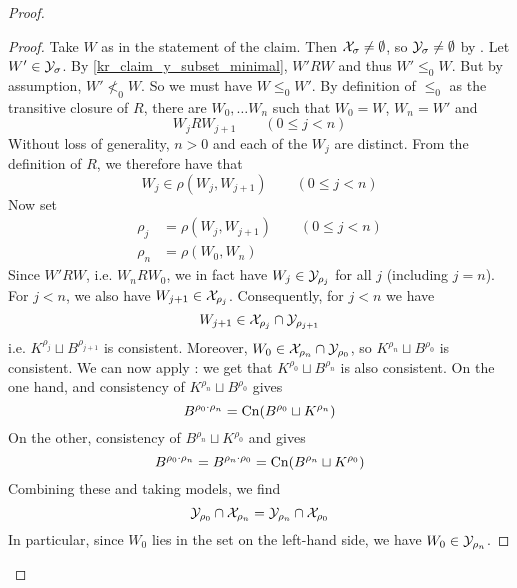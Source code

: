 \begin{proof}
\begin{proof}
        Take $W$ as in the statement of the claim. Then $\mathcal{X}_\sigma \ne
        \emptyset$, so $\mathcal{Y}_\sigma \ne \emptyset$ by
        \condcons{}. Let $W' \in \mathcal{Y}_\sigma$.  By
        \cref{kr_claim_y_subset_minimal}, $W' R W$ and thus $W' \le_0 W$. But by
        assumption, $W' \not<_0 W$. So we must have $W \le_0 W'$. By definition
        of $\le_0$ as the transitive closure of $R$, there are $W_0, \ldots
        W_n$ such that $W_0 = W$, $W_n = W'$ and
        \[
            W_j R W_{j+1} \qquad (0 \le j < n)
        \]
        Without loss of generality, $n > 0$ and each of the $W_j$ are distinct.
        From the definition of $R$, we therefore have that
        \[
            W_j \in \rho(W_j, W_{j+1}) \qquad (0 \le j < n)
        \]
        Now set
        \begin{align*}
            \rho_j &= \rho(W_j, W_{j+1}) \qquad (0 \le j < n) \\
            \rho_n &= \rho(W_0, W_n)
        \end{align*}
        Since $W' R W$, i.e. $W_n R W_0$, we in fact have $W_j \in \mathcal{Y}_{\rho_j}$
        for all $j$ (including $j = n$). For $j < n$, we also have $W_{j+1} \in
        \mathcal{X}_{\rho_j}$.\footnotemark{}
        Consequently, for $j < n$ we have
        \[
            W_{j+1} \in \mathcal{X}_{\rho_j} \cap \mathcal{Y}_{\rho_{j+1}}
        \]
        i.e. $K^{\rho_j} \sqcup B^{\rho_{j+1}}$ is consistent. Moreover, $W_0
        \in \mathcal{X}_{\rho_n} \cap \mathcal{Y}_{\rho_0}$, so $K^{\rho_n} \sqcup B^{\rho_0}$ is
        consistent. We can now apply \acyc{}: we get that $K^{\rho_0}
        \sqcup B^{\rho_n}$ is also consistent. On the one hand,
        \incvac{} and consistency of $K^{\rho_n} \sqcup
        B^{\rho_0}$ gives
        \[
            B^{\rho_0 \cdot \rho_n}
            = \operatorname{Cn}(B^{\rho_0} \sqcup K^{\rho_n})
        \]
        On the other, consistency of $B^{\rho_n} \sqcup K^{\rho_0}$ and
        \rearr{} gives
        \[
            B^{\rho_0 \cdot \rho_n}
            = B^{\rho_n \cdot \rho_0}
            = \operatorname{Cn}(B^{\rho_n} \sqcup K^{\rho_0})
        \]
        Combining these and taking models, we find
        \[
            \mathcal{Y}_{\rho_0} \cap \mathcal{X}_{\rho_n}
            =
            \mathcal{Y}_{\rho_n} \cap \mathcal{X}_{\rho_0}
        \]
        In particular, since $W_0$ lies in the set on the left-hand side, we
        have $W_0 \in \mathcal{Y}_{\rho_n}$.


\end{proof}
\end{proof}
